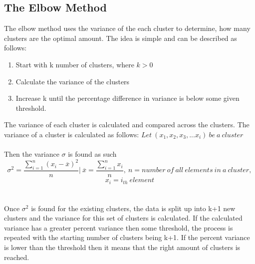 \subsection{The Elbow Method}
\label{sub:elbow_method}
The elbow method uses the variance of the each cluster to determine, how many clusters are the optimal amount. The idea is simple and can be described as follows:
\begin{enumerate}
\item Start with k number of clusters, where $k>0$
\item Calculate the variance of the clusters
\item Increase k until the percentage difference in variance is below some given threshold.
\end{enumerate}
The variance of each cluster is calculated and compared across the clusters. The variance of a cluster is calculated as follows:
$Let\ (x_1,x_2,x_3,...x_i) \ be \ a\ cluster $
\\\\Then the variance $\sigma$ is found as such
$$\sigma^2 = \frac{\displaystyle\sum_{i = 1}^{n}(x_{i}-\overline{x})^2 }{n} \Biggr\rvert\ \overline{x}  =\frac{\displaystyle\sum_{i=1}^{n}x_{i}}{n},\ n =number\ of\ all\ elements\ in\ a\ cluster ,$$ 
$$ x_{i} = i_{th}\ element $$
\\\\
Once $\sigma^2$ is found for the existing clusters, the data is split up into k+1 new clusters and the variance for this set of clusters is calculated. If the calculated variance has a greater percent variance then some threshold, the process is repeated with the starting number of clusters being k+1. If the percent variance is lower than the threshold then it means that the right amount of clusters is reached.
